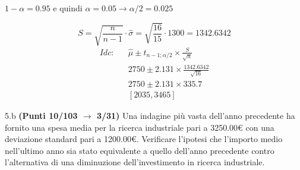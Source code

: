 \documentclass[
  11pt,
]{book}
\theoremstyle{mytheoremstyle}
\theoremstyle{mydefstyle}
\begin{document}
\(1-\alpha =0.95\) e quindi \(\alpha=0.05\rightarrow \alpha/2=0.025\)

\[
      S  =\sqrt{\frac {n}{n-1}}\cdot\hat\sigma =
     \sqrt{\frac { 16 }{ 15 }}\cdot 1300 = 1342.6342 
\]
\begin{eqnarray*}
  Idc: & &  \hat\mu \pm  t_{n-1;\alpha/2} \times \frac{S}{\sqrt{n}} \\
     & &  2750 \pm  2.131 \times \frac{ 1342.6342 }{\sqrt{ 16 }} \\
     & &  2750 \pm  2.131 \times  335.7 \\
     & & [ 2035 ,  3465 ]
\end{eqnarray*}

5.b \textbf{(Punti 10/103 \(\rightarrow\) 3/31)} Una indagine più vasta dell'anno precedente
ha fornito una spesa media per la ricerca industriale pari a
3250.00€ con una deviazione standard pari a 1200.00€.
Verificare l'ipotesi
che l'importo medio nell'ultimo anno sia stato equivalente a
quello dell'anno precedente contro l'alternativa di una
diminuzione dell'investimento in ricerca industriale.
\end{document}
